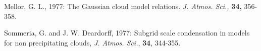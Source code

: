 \por
Mellor, G. L., 1977: The Gaussian cloud model relations.
{\it J. Atmos. Sci.,} {\bf 34,} 356-358.

\por 
Sommeria, G. and J. W. Deardorff, 1977:
Subgrid scale condensation in models for non precipitating clouds,
{\it J. Atmos. Sci.}, {\bf 34}, 344-355.

